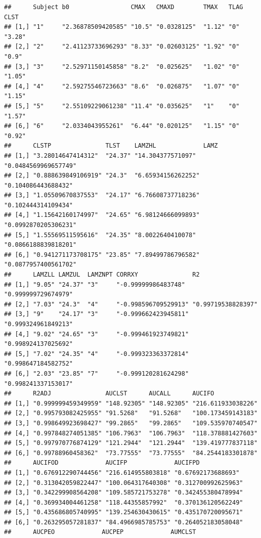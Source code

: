 \documentclass[12pt,]{krantz}
\theoremstyle{definition}
\theoremstyle{definition}
\theoremstyle{definition}
\theoremstyle{remark}
\begin{document}
\begin{verbatim}
##      Subject b0                 CMAX   CMAXD        TMAX   TLAG CLST  
## [1,] "1"     "2.36878509420585" "10.5" "0.0328125"  "1.12" "0"  "3.28"
## [2,] "2"     "2.41123733696293" "8.33" "0.02603125" "1.92" "0"  "0.9" 
## [3,] "3"     "2.52971150145858" "8.2"  "0.025625"   "1.02" "0"  "1.05"
## [4,] "4"     "2.59275546723663" "8.6"  "0.026875"   "1.07" "0"  "1.15"
## [5,] "5"     "2.55109229061238" "11.4" "0.035625"   "1"    "0"  "1.57"
## [6,] "6"     "2.0334043955261"  "6.44" "0.020125"   "1.15" "0"  "0.92"
##      CLSTP               TLST    LAMZHL             LAMZ                
## [1,] "3.28014647414312"  "24.37" "14.304377571097"  "0.0484569969657749"
## [2,] "0.888639849106919" "24.3"  "6.65934156262252" "0.104086443688432" 
## [3,] "1.05509670837553"  "24.17" "6.76608737718236" "0.102444314109434" 
## [4,] "1.15642160174997"  "24.65" "6.98124666099893" "0.0992870205306231"
## [5,] "1.55569511595616"  "24.35" "8.0022640410078"  "0.0866188839818201"
## [6,] "0.941271173708175" "23.85" "7.89499786796582" "0.0877957400561702"
##      LAMZLL LAMZUL  LAMZNPT CORRXY               R2                 
## [1,] "9.05" "24.37" "3"     "-0.99999986483748"  "0.999999729674979"
## [2,] "7.03" "24.3"  "4"     "-0.998596709529913" "0.99719538828397" 
## [3,] "9"    "24.17" "3"     "-0.999662423945811" "0.999324961849213"
## [4,] "9.02" "24.65" "3"     "-0.999461923749821" "0.998924137025692"
## [5,] "7.02" "24.35" "4"     "-0.999323363372814" "0.998647184582752"
## [6,] "2.03" "23.85" "7"     "-0.999120281624298" "0.998241337153017"
##      R2ADJ               AUCLST      AUCALL      AUCIFO            
## [1,] "0.999999459349959" "148.92305" "148.92305" "216.611933038226"
## [2,] "0.995793082425955" "91.5268"   "91.5268"   "100.173459143183"
## [3,] "0.998649923698427" "99.2865"   "99.2865"   "109.535970740547"
## [4,] "0.997848274051385" "106.7963"  "106.7963"  "118.378881427603"
## [5,] "0.997970776874129" "121.2944"  "121.2944"  "139.419777837118"
## [6,] "0.99788960458362"  "73.77555"  "73.77555"  "84.2544183301878"
##      AUCIFOD             AUCIFP             AUCIFPD            
## [1,] "0.676912290744456" "216.614955803818" "0.67692173688693" 
## [2,] "0.313042059822447" "100.064317640308" "0.312700992625963"
## [3,] "0.342299908564208" "109.585721753278" "0.342455380478994"
## [4,] "0.369934004461258" "118.44355857992"  "0.370136120562249"
## [5,] "0.435686805740995" "139.254630430615" "0.435170720095671"
## [6,] "0.263295057281837" "84.4966985785753" "0.264052183058048"
##      AUCPEO             AUCPEP             AUMCLST       

\end{verbatim}
\end{document}
